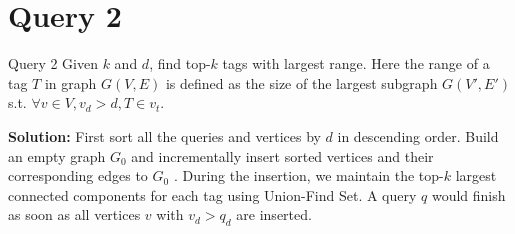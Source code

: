 
\section{Query 2}
\begin{frame}{Query 2}
Given $k$ and $d$, find top-$k$ tags with largest range. Here the
range of a tag $T$ in graph $G(V, E)$ is defined as the size of the
largest subgraph $G(V', E')$ s.t. $\forall v \in V ,v_d > d,  T \in v_t $.

\textbf{Solution:} First sort all the queries and vertices by $d$ in descending order.
Build an empty graph $G_0$ and incrementally insert sorted
vertices and their corresponding edges to $G_0$ .
  During the insertion, we maintain the top-$k$ largest connected
components for each tag using Union-Find Set. A query $q$ would
finish as soon as all vertices $v$ with $v_d>q_d$ are inserted.
\end{frame}

